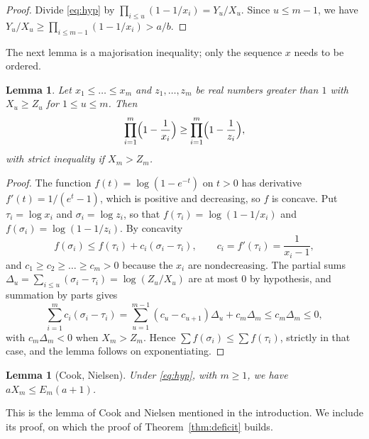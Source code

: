 \documentclass[screen,reqno]{aomart}
\numberwithin{equation}{section}
\theoremstyle{plain}
\newtheorem{lemma}[theorem]{Lemma}
\theoremstyle{definition}
\theoremstyle{remark}
\begin{document}
\begin{proof}
Divide \eqref{eq:hyp} by $\prod_{i\le u}(1-1/x_i)=Y_u/X_u$. Since
$u\le m-1$, we have $Y_u/X_u\ge\prod_{i\le m-1}(1-1/x_i)>a/b$.
\end{proof}

The next lemma is a majorisation inequality; only the sequence $x$
needs to be ordered.

\begin{lemma}\label{lem:major}
Let $x_1\le\dots\le x_m$ and $z_1,\dots,z_m$ be real numbers greater
than $1$ with $X_u\ge Z_u$ for $1\le u\le m$. Then
\[
  \prod_{i=1}^{m}\Bigl(1-\frac1{x_i}\Bigr)\ge
  \prod_{i=1}^{m}\Bigl(1-\frac1{z_i}\Bigr),
\]
with strict inequality if $X_m>Z_m$.
\end{lemma}

\begin{proof}
The function $f(t)=\log(1-e^{-t})$ on $t>0$ has derivative
$f'(t)=1/(e^t-1)$, which is positive and decreasing, so $f$ is
concave. Put $\tau_i=\log x_i$ and $\sigma_i=\log z_i$, so that
$f(\tau_i)=\log(1-1/x_i)$ and $f(\sigma_i)=\log(1-1/z_i)$. By
concavity
\[
  f(\sigma_i)\le f(\tau_i)+c_i(\sigma_i-\tau_i),\qquad
  c_i=f'(\tau_i)=\frac1{x_i-1},
\]
and $c_1\ge c_2\ge\dots\ge c_m>0$ because the $x_i$ are
nondecreasing. The partial sums
$\Delta_u=\sum_{i\le u}(\sigma_i-\tau_i)=\log(Z_u/X_u)$ are at most
$0$ by hypothesis, and summation by parts gives
\[
  \sum_{i=1}^{m}c_i(\sigma_i-\tau_i)
  =\sum_{u=1}^{m-1}(c_u-c_{u+1})\Delta_u+c_m\Delta_m
  \le c_m\Delta_m\le0 ,
\]
with $c_m\Delta_m<0$ when $X_m>Z_m$. Hence
$\sum f(\sigma_i)\le\sum f(\tau_i)$, strictly in that case, and the
lemma follows on exponentiating.
\end{proof}

\begin{lemma}[Cook, Nielsen]\label{lem:cn}
Under \eqref{eq:hyp}, with $m\ge1$, we have $aX_m\le E_m(a+1)$.
\end{lemma}

This is the lemma of Cook \cite{Coo99} and Nielsen \cite{Nie03}
mentioned in the introduction. We include its proof, on which the
proof of Theorem~\ref{thm:deficit} builds.
\end{document}
